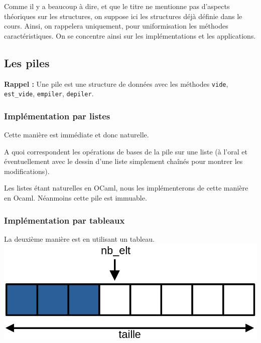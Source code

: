 
\begin{com}
	Comme il y a beaucoup à dire, et que le titre ne mentionne pas d'aspects théoriques sur les structures, on suppose ici les structures déjà définie dans le cours. Ainsi, on rappelera uniquement, pour uniformisation les méthodes caractéristiques. On se concentre ainsi sur les implémentations et les applications.
\end{com}

\subsection{Les piles}

\textbf{Rappel :} Une pile est une structure de données avec les méthodes \texttt{vide}, \texttt{est\_vide}, \texttt{empiler}, \texttt{depiler}.

\subsubsection{Implémentation par listes}

Cette manière est immédiate et donc naturelle.

\begin{exercise}
	A quoi correspondent les opérations de bases de la pile sur une liste (à l'oral et éventuellement avec le dessin d'une liste simplement chaînés pour montrer les modifications).
\end{exercise}

Les listes étant naturelles en OCaml, nous les implémenterons de cette manière en Ocaml. Néanmoins cette pile est immuable.

\subsubsection{Implémentation par tableaux}

La deuxième manière est en utilisant un tableau. \\

\includegraphics[scale=0.3]{lecon/05-piles_files/piles_tableau.png}
\\

